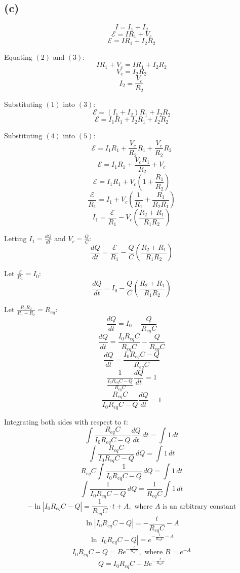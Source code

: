 \documentclass[11pt]{article}
\begin{document}
\subsection{(c)}
\label{sec:org5285330}
\[I = I_1 + I_2 \tag{1}\]
\[\mathcal{E} = IR_1 + V_c \tag{2}\]
\[\mathcal{E} = IR_1 + I_2R_2 \tag{3}\]

Equating \((2)\) and \((3)\):
\[IR_1 + V_c = IR_1 + I_2 R_2\]
\[V_c = I_2 R_2\]
\[I_2 = \frac{V_c}{R_2} \tag{4}\]

Substituting \((1)\) into \((3)\):
\[\mathcal{E} = (I_1 + I_2) R_1 + I_2R_2\]
\[\mathcal{E} = I_1 R_1 + I_2 R_1 + I_2R_2 \tag{5}\]

Substituting \((4)\) into \((5)\):
\[\mathcal{E} = I_1 R_1 + \frac{V_c}{R_2} R_1 + \frac{V_c}{R_2} R_2\]
\[\mathcal{E} = I_1 R_1 + \frac{V_c R_1}{R_2} + V_c\]
\[\mathcal{E} = I_1 R_1 + V_c \left( 1 + \frac{R_1}{R_2}\right)\]
\[\frac{\mathcal{E}}{R_1} = I_1 + V_c \left( \frac{1}{R_1} + \frac{R_1}{R_2R_1}\right)\]
\[I_1 = \frac{\mathcal{E}}{R_1} - V_c \left( \frac{R_2 + R_1}{R_1R_2}\right) \]

\newpage

Letting \(I_1 = \frac{dQ}{dt}\) and \(V_c = \frac{Q}{C}\):
\[\frac{dQ}{dt} = \frac{\mathcal{E}}{R_1} - \frac{Q}{C} \left( \frac{R_2 + R_1}{R_1 R_2} \right)\]

Let \(\frac{\mathcal{E}}{R_1} = I_0\):
\[\frac{dQ}{dt} = I_0 - \frac{Q}{C} \left( \frac{R_2 + R_1}{R_1 R_2} \right)\]

Let \(\frac{R_1 R_2}{R_1 + R_2} = R_{eq}\):
\[\frac{dQ}{dt} = I_0 - \frac{Q}{R_{eq}C}\]
\[\frac{dQ}{dt} = \frac{I_0 R_{eq}C}{R_{eq}C} - \frac{Q}{R_{eq}C}\]
\[\frac{dQ}{dt} = \frac{I_0 R_{eq}C - Q}{R_{eq}C}\]
\[\frac{1}{\frac{I_0 R_{eq}C - Q}{R_{eq}C}} \frac{dQ}{dt} = 1\]
\[\frac{R_{eq}C}{I_0 R_{eq}C - Q} \frac{dQ}{dt} = 1\]

Integrating both sides with respect to \(t\):
\[\int \frac{R_{eq}C}{I_0 R_{eq}C - Q} \frac{dQ}{dt} \, dt = \int 1 \, dt\]
\[\int \frac{R_{eq}C}{I_0 R_{eq}C - Q} \, dQ = \int 1 \, dt\]
\[R_{eq} C \int \frac{1}{I_0 R_{eq}C - Q} \, dQ = \int 1 \, dt\]
\[\int \frac{1}{I_0 R_{eq}C - Q} \, dQ = \frac{1}{R_{eq} C} \int 1 \, dt\]
\[- \ln |I_0 R_{eq} C - Q| = \frac{1}{R_{eq} C} \cdot t + A, \text{ where } A \text{ is an arbitrary constant}\]
\[\ln |I_0 R_{eq} C - Q| = - \frac{t}{R_{eq} C} - A\]
\[\ln |I_0 R_{eq} C - Q| = e^{- \frac{t}{R_{eq} C} - A}\]
\[I_0 R_{eq} C - Q = Be^{- \frac{t}{R_{eq} C}}, \text{ where } B = e^{-A}\]
\[Q = I_0 R_{eq} C - Be^{- \frac{t}{R_{eq} C}}\]

\newpage
\end{document}
